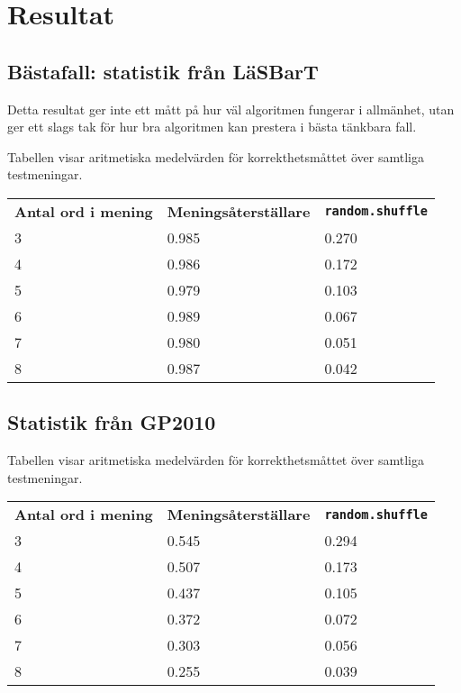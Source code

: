 \documentclass[a4paper,11pt]{article}
\begin{document}
\section*{Resultat}
\subsection*{Bästafall: statistik från LäSBarT}
Detta resultat ger inte ett mått på hur väl algoritmen fungerar i allmänhet, utan
ger ett slags tak för hur bra algoritmen kan prestera i bästa tänkbara fall.

\vspace{0.25cm}
\noindent
Tabellen visar aritmetiska medelvärden för korrekthetsmåttet över samtliga testmeningar.

\begin{center}
\begin{tabular}{l l l}
\textbf{Antal ord i mening} & \textbf{Meningsåterställare} & \textbf{\texttt{random.shuffle}}\\
3 & 0.985 & 0.270\\
4 & 0.986 & 0.172\\
5 & 0.979 & 0.103\\
6 & 0.989 & 0.067\\
7 & 0.980 & 0.051\\
8 & 0.987 & 0.042\\
\end{tabular}
\end{center}

\subsection*{Statistik från GP2010}

Tabellen visar aritmetiska medelvärden för korrekthetsmåttet över samtliga testmeningar.
\begin{center}
\begin{tabular}{l l l}
\textbf{Antal ord i mening} & \textbf{Meningsåterställare} & \textbf{\texttt{random.shuffle}}\\
3 & 0.545 & 0.294\\
4 & 0.507 & 0.173\\
5 & 0.437 & 0.105\\
6 & 0.372 & 0.072\\
7 & 0.303 & 0.056\\
8 & 0.255 & 0.039\\
\end{tabular}
\end{center}
\end{document}
